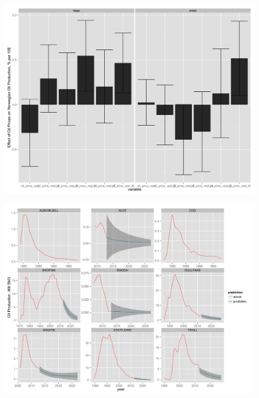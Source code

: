 \documentclass{beamer}
\begin{document}
\begin{frame}[plain]
	\begin{figure}
	\includegraphics[width=1\textwidth]{coeff_split_plot.png}
	\end{figure}
\end{frame}


\begin{frame}[plain]
	\begin{figure}
	\includegraphics[width=1\textwidth]{field_lev_forecast.png}
	\end{figure}
\end{frame}
\end{document}
